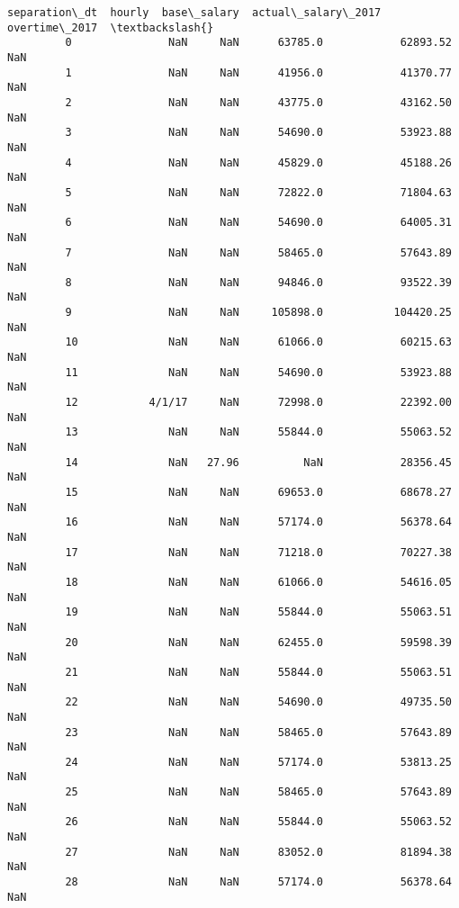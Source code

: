 \documentclass[11pt]{article}
\begin{document}
\begin{Verbatim}[commandchars=\\\{\}]
               separation\_dt  hourly  base\_salary  actual\_salary\_2017  overtime\_2017  \textbackslash{}
         0               NaN     NaN      63785.0            62893.52            NaN   
         1               NaN     NaN      41956.0            41370.77            NaN   
         2               NaN     NaN      43775.0            43162.50            NaN   
         3               NaN     NaN      54690.0            53923.88            NaN   
         4               NaN     NaN      45829.0            45188.26            NaN   
         5               NaN     NaN      72822.0            71804.63            NaN   
         6               NaN     NaN      54690.0            64005.31            NaN   
         7               NaN     NaN      58465.0            57643.89            NaN   
         8               NaN     NaN      94846.0            93522.39            NaN   
         9               NaN     NaN     105898.0           104420.25            NaN   
         10              NaN     NaN      61066.0            60215.63            NaN   
         11              NaN     NaN      54690.0            53923.88            NaN   
         12           4/1/17     NaN      72998.0            22392.00            NaN   
         13              NaN     NaN      55844.0            55063.52            NaN   
         14              NaN   27.96          NaN            28356.45            NaN   
         15              NaN     NaN      69653.0            68678.27            NaN   
         16              NaN     NaN      57174.0            56378.64            NaN   
         17              NaN     NaN      71218.0            70227.38            NaN   
         18              NaN     NaN      61066.0            54616.05            NaN   
         19              NaN     NaN      55844.0            55063.51            NaN   
         20              NaN     NaN      62455.0            59598.39            NaN   
         21              NaN     NaN      55844.0            55063.51            NaN   
         22              NaN     NaN      54690.0            49735.50            NaN   
         23              NaN     NaN      58465.0            57643.89            NaN   
         24              NaN     NaN      57174.0            53813.25            NaN   
         25              NaN     NaN      58465.0            57643.89            NaN   
         26              NaN     NaN      55844.0            55063.52            NaN   
         27              NaN     NaN      83052.0            81894.38            NaN   
         28              NaN     NaN      57174.0            56378.64            NaN   

\end{Verbatim}
\end{document}
